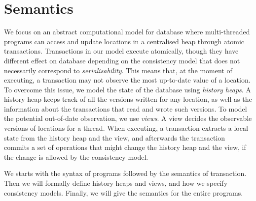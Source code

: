 \section{Semantics\label{sec:semantics}}

We focus on an abstract computational model for database where multi-threaded programs can access and update locations in a centralised heap through atomic transactions. 
Transactions in our model execute atomically, though they have different effect on database depending on the consistency model that does not necessarily correspond to \emph{serialisability}. 
This means that, at the moment of executing, a transaction may not observe the most up-to-date value of a location. 
To overcome this issue, we model the state of the database using \emph{history heaps}. 
A history heap keeps track of all the versions written for any location, as well as the information about the transactions that read and wrote such versions. 
To model the potential out-of-date observation, we use \emph{views}.
A view decides the observable versions of locations for a thread.
When executing, a transaction extracts a local state from the history heap and the view, and afterwards the transaction commits a set of operations that might change the history heap and the view, if the change is allowed by the consistency model.

We starts with the syntax of programs followed by the semantics of transaction.
Then we will formally define history heaps and views, and how we specify consistency models.
Finally, we will give the semantics for the entire programs.



%

